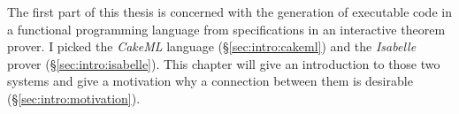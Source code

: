 
\noindent
The first part of this thesis is concerned with the generation of executable code in a functional programming language from specifications in an interactive theorem prover.
I picked the \emph{CakeML} language (§\ref{sec:intro:cakeml}) and the \emph{Isabelle} prover (§\ref{sec:intro:isabelle}).
This chapter will give an introduction to those two systems and give a motivation why a connection between them is desirable (§\ref{sec:intro:motivation}).